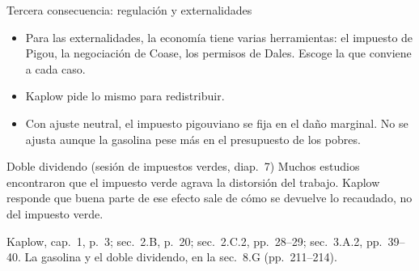 \documentclass[aspectratio=169,11pt]{beamer}
\newcommand{\fuente}[1]{\par\vfill{\small\color{cGris}#1\par}}
\begin{document}
\begin{frame}{Tercera consecuencia: regulación y externalidades}
  \begin{itemize}
    \item Para las externalidades, la economía tiene varias herramientas: el impuesto de Pigou, la negociación de Coase, los permisos de Dales. Escoge la que conviene a cada caso.
    \item Kaplow pide lo mismo para redistribuir.
  \end{itemize}
  \pause
  \begin{itemize}
    \item Con ajuste neutral, el impuesto pigouviano se fija en el daño marginal. No se ajusta aunque la gasolina pese más en el presupuesto de los pobres.
  \end{itemize}
  \pause
  \begin{block}{Doble dividendo (sesión de impuestos verdes, diap.~7)}
    Muchos estudios encontraron que el impuesto verde agrava la distorsión del trabajo. Kaplow responde que buena parte de ese efecto sale de cómo se devuelve lo recaudado, no del impuesto verde.
  \end{block}
  \fuente{Kaplow, cap.~1, p.~3; sec.~2.B, p.~20; sec.~2.C.2, pp.~28--29; sec.~3.A.2, pp.~39--40. La gasolina y el doble dividendo, en la sec.~8.G (pp.~211--214).}
\end{frame}
\end{document}
